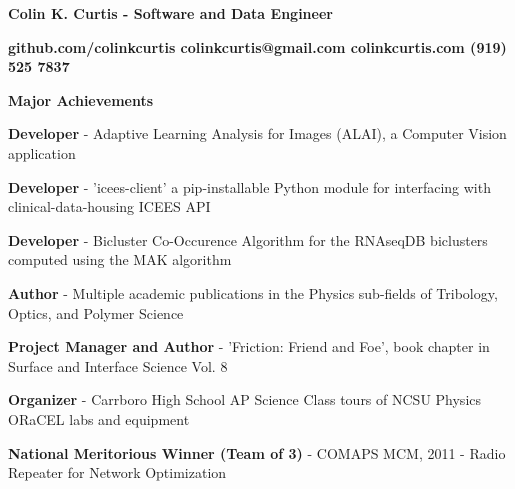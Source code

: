 \documentclass[letterpaper,final]{memoir}
\newcommand{\LargeSep}{\vspace{1.3em}}
\newcommand{\Sep}{\vspace{1.0em}}
\newcommand{\SmallSep}{\vspace{0.4em}}
\newcommand{\CVSection}[1]
	{\LARGE\textbf{#1}\par
	\SmallSep\normalsize}
\newcommand{\CVItem}[1]
	{\textbf{\color{Blue} #1}}
\newcommand\tab[1][1cm]{\hspace*{#1}}
\begin{document}
\Huge \bfseries {\color{Blue} Colin K. Curtis - Software and Data Engineer}

\Sep
\normalsize\normalfont

\CVItem  \tab \bfseries {github.com/colinkcurtis \tab colinkcurtis@gmail.com  \tab colinkcurtis.com \tab  (919) 525 7837} 

\LargeSep





\notoserif \CVSection{Major Achievements}
\normalfont

\Sep

\begin{compactitem}

    \item \textbf{Developer} - Adaptive Learning Analysis for Images (ALAI), a Computer Vision application
    \SmallSep

    \item \textbf{Developer} - 'icees-client' a pip-installable Python module for interfacing with clinical-data-housing ICEES API
    \SmallSep

    \item \textbf{Developer} - Bicluster Co-Occurence Algorithm for the RNAseqDB biclusters computed using the MAK algorithm
    \SmallSep

    \item \textbf{Author} - Multiple academic publications in the Physics sub-fields of Tribology, Optics, and Polymer Science
    \SmallSep

    \item \textbf{Project Manager and Author} - 'Friction: Friend and Foe', book chapter in Surface and Interface Science Vol. 8
    \SmallSep

    \item \textbf{Organizer} - Carrboro High School AP Science Class tours of NCSU Physics ORaCEL labs and equipment
    \SmallSep

    \item \textbf{National Meritorious Winner (Team of 3)} - COMAPS MCM, 2011 - Radio Repeater for Network Optimization
    \SmallSep



\end{compactitem}

\LargeSep
\end{document}
